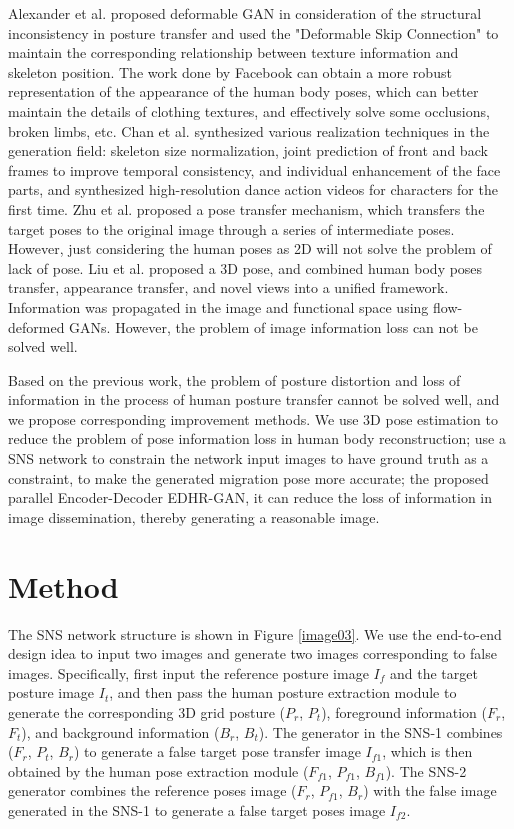 Alexander et al. \cite{siarohin2018deformable} proposed deformable GAN in consideration of the structural inconsistency in posture transfer and used the "Deformable Skip Connection" to maintain the corresponding relationship between texture information and skeleton position. The work done by Facebook \cite{neverova2018dense} can obtain a more robust representation of the appearance of the human body poses, which can better maintain the details of clothing textures, and effectively solve some occlusions, broken limbs, etc. Chan et al.\cite{chan2019everybody} synthesized various realization techniques in the generation field: skeleton size normalization, joint prediction of front and back frames to improve temporal consistency, and individual enhancement of the face parts, and synthesized high-resolution dance action videos for characters for the first time. Zhu et al. \cite{zhu2019progressive} proposed a pose transfer mechanism, which transfers the target poses to the original image through a series of intermediate poses. However, just considering the human poses as 2D will not solve the problem of lack of pose. Liu et al. \cite{liu2019liquid} proposed a 3D pose, and combined human body poses transfer, appearance transfer, and novel views into a unified framework. Information was propagated in the image and functional space using flow-deformed GANs. However, the problem of image information loss can not be solved well.
	
Based on the previous work, the problem of posture distortion and loss of information in the process of human posture transfer cannot be solved well, and we propose corresponding improvement methods. We use 3D pose estimation to reduce the problem of pose information loss in human body reconstruction; use a SNS network to constrain the network input images to have ground truth as a constraint, to make the generated migration pose more accurate; the proposed parallel Encoder-Decoder EDHR-GAN, it can reduce the loss of information in image dissemination, thereby generating a reasonable image.
	
\section{Method}
	
The SNS network structure is shown in Figure \ref{image03}. We use the end-to-end design idea to input two images and generate two images corresponding to false images. Specifically, first input the reference posture image $I_f$ and the target posture image $I_t$, and then pass the human posture extraction module to generate the corresponding 3D grid posture ($P_r$, $P_t$), foreground information ($F_r$, $F_t$), and background information ($B_r$, $B_t$). The generator in the SNS-1 combines ($F_r$, $P_t$, $B_r$) to generate a false target pose transfer image $I_{f1}$, which is then obtained by the human pose extraction module ($F_{f1}$, $P_{f1}$, $B_{f1}$). The SNS-2 generator combines the reference poses image ($F_r$, $P_{f1}$, $B_r$) with the false image generated in the SNS-1 to generate a false target poses image $I_{f2}$.
	
